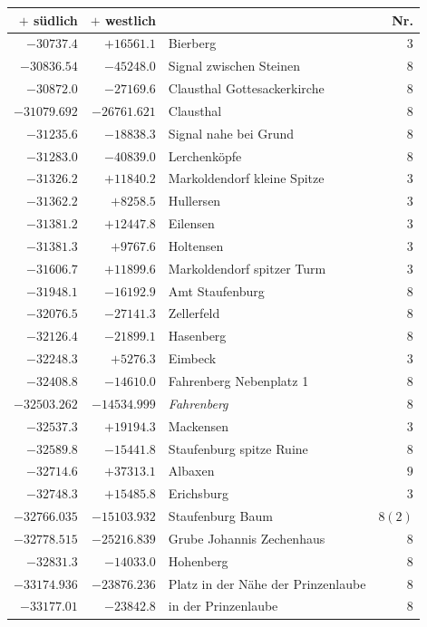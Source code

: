 \begin{center}\begingroup\fontsize{8}{9}\selectfont
\setlength{\tabcolsep}{4pt}
\begin{tabular}{r|r|p{170pt}|r}\hline
\(+\) südlich&\(+\) westlich&&Nr.\\\hline
\(-30737.4\)&\(+16561.1\)&Bierberg&\(3\)\\
\(-30836.54\)&\(-45248.0\)&Signal zwischen Steinen&\(8\)\\
\(-30872.0\)&\(-27169.6\)&Clausthal Gottesackerkirche&\(8\)\\
\(-31079.692\)&\(-26761.621\)&Clausthal&\(8\)\\
\(-31235.6\)&\(-18838.3\)&Signal nahe bei Grund&\(8\)\\
\(-31283.0\)&\(-40839.0\)&Lerchenköpfe&\(8\)\\
\(-31326.2\)&\(+11840.2\)&Markoldendorf kleine Spitze&\(3\)\\
\(-31362.2\)&\(+8258.5\)&Hullersen&\(3\)\\
\(-31381.2\)&\(+12447.8\)&Eilensen&\(3\)\\
\(-31381.3\)&\(+9767.6\)&Holtensen&\(3\)\\
\(-31606.7\)&\(+11899.6\)&Markoldendorf spitzer Turm&\(3\)\\
\(-31948.1\)&\(-16192.9\)&Amt Staufenburg&\(8\)\\
\(-32076.5\)&\(-27141.3\)&Zellerfeld&\(8\)\\
\(-32126.4\)&\(-21899.1\)&Hasenberg&\(8\)\\
\(-32248.3\)&\(+5276.3\)&Eimbeck&\(3\)\\
\(-32408.8\)&\(-14610.0\)&Fahrenberg Nebenplatz 1&\(8\)\\
\(-32503.262\)&\(-14534.999\)&\textit{Fahrenberg}&\(8\)\\
\(-32537.3\)&\(+19194.3\)&Mackensen&\(3\)\\
\(-32589.8\)&\(-15441.8\)&Staufenburg spitze Ruine&\(8\)\\
\(-32714.6\)&\(+37313.1\)&Albaxen&\(9\)\\
\(-32748.3\)&\(+15485.8\)&Erichsburg&\(3\)\\
\(-32766.035\)&\(-15103.932\)&Staufenburg Baum&\(8 (2)\)\\
\(-32778.515\)&\(-25216.839\)&Grube Johannis Zechenhaus&\(8\)\\
\(-32831.3\)&\(-14033.0\)&Hohenberg&\(8\)\\
\(-33174.936\)&\(-23876.236\)&Platz in der Nähe der Prinzenlaube&\(8\)\\
\(-33177.01\)&\(-23842.8\)&in der Prinzenlaube&\(8\)\\

\end{tabular}
\end{center}
